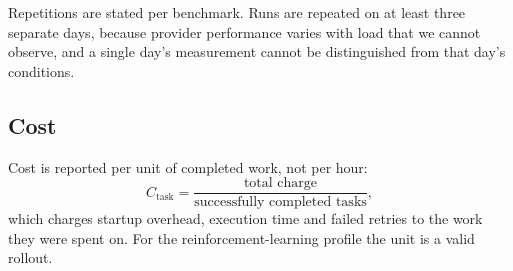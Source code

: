 Repetitions are stated per benchmark. Runs are repeated on at least three
separate days, because provider performance varies with load that we cannot
observe, and a single day's measurement cannot be distinguished from that
day's conditions. 

\subsection{Cost}

Cost is reported per unit of completed work, not per hour:
\[
  C_{\mathrm{task}} = \frac{\text{total charge}}
  {\text{successfully completed tasks}},
\]
which charges startup overhead, execution time and failed retries to the work
they were spent on. For the reinforcement-learning profile the unit is a
valid rollout. 
